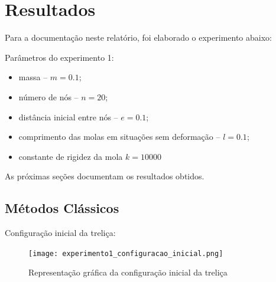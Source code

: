 \documentclass{article}
\begin{document}
\section{Resultados}
Para a documentação neste relatório, foi elaborado o experimento abaixo:\newline

Parâmetros do experimento 1:
\begin{itemize}
\item massa  -- $m = 0.1$;
\item número de nós  -- $n = 20$;
\item distância inicial entre nós -- $e = 0.1$;
\item comprimento das molas em situações sem deformação -- $l = 0.1$;
\item constante de rigidez da mola $k = 10000$
\end{itemize}
As próximas seções documentam os resultados obtidos.
\subsection{Métodos Clássicos}

Configuração inicial da treliça:

\begin{figure}[H]
  \centering
  \texttt{[image: experimento1\_configuracao\_inicial.png]}
  \caption{Representação gráfica da configuração inicial da treliça}
\end{figure}
\end{document}
